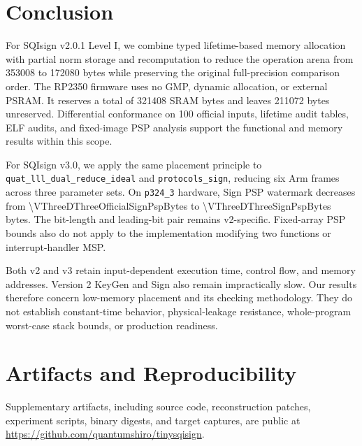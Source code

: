 \documentclass[a4paper,10pt]{article}
\theoremstyle{definition}
\theoremstyle{remark}
\begin{document}
\section{Conclusion}
\label{sec:conclusion}

For SQIsign v2.0.1 Level I, we combine typed lifetime-based memory allocation with partial norm storage and recomputation to reduce the operation arena from \num{353008} to \num{172080} bytes while preserving the original full-precision comparison order. The RP2350 firmware uses no GMP, dynamic allocation, or external PSRAM. It reserves a total of \num{321408} SRAM bytes and leaves \num{211072} bytes unreserved. Differential conformance on 100 official inputs, lifetime audit tables, ELF audits, and fixed-image PSP analysis support the functional and memory results within this scope.

For SQIsign v3.0, we apply the same placement principle to \texttt{quat\_lll\_dual\_reduce\_ideal} and \texttt{protocols\_sign}, reducing six Arm frames across three parameter sets. On \texttt{p324\_3} hardware, Sign PSP watermark decreases from \num{\VThreeDThreeOfficialSignPspBytes} to \num{\VThreeDThreeSignPspBytes} bytes. The bit-length and leading-bit pair remains v2-specific. Fixed-array PSP bounds also do not apply to the implementation modifying two functions or interrupt-handler MSP.

Both v2 and v3 retain input-dependent execution time, control flow, and memory addresses. Version 2 KeyGen and Sign also remain impractically slow. Our results therefore concern low-memory placement and its checking methodology. They do not establish constant-time behavior, physical-leakage resistance, whole-program worst-case stack bounds, or production readiness.

\section*{Artifacts and Reproducibility}

Supplementary artifacts, including source code, reconstruction patches, experiment scripts, binary digests, and target captures, are public at \url{https://github.com/quantumshiro/tinysqisign}.

\printbibliography[title={References}]
\end{document}
